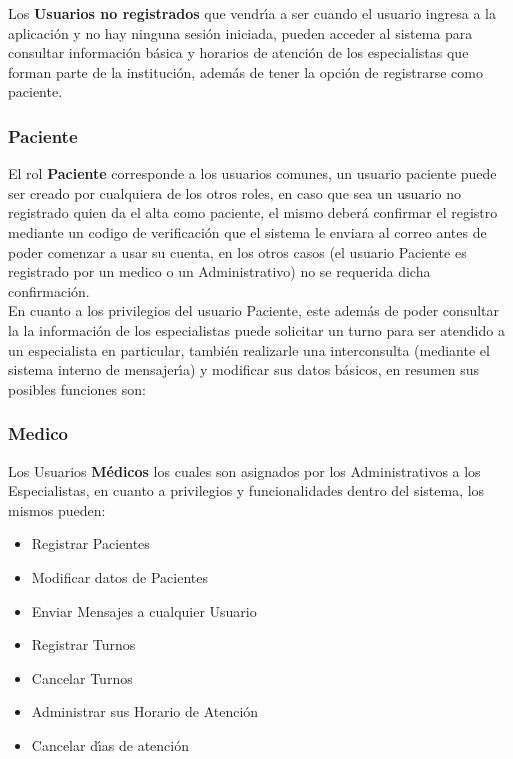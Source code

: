Los \textbf{Usuarios no registrados} que vendr\'{\i}a a ser cuando el usuario ingresa
a la aplicaci\'on y no hay ninguna sesi\'on iniciada, pueden acceder al sistema para 
consultar informaci\'on b\'asica y horarios de atenci\'on de los especialistas que 
forman parte de la instituci\'on, adem\'as de tener la opci\'on de registrarse 
como paciente.\\[0.1cm]    

\subsubsection{Paciente}

El rol \textbf{Paciente} corresponde a los usuarios comunes, un usuario paciente puede 
ser creado por cualquiera de los otros roles, en caso que sea un usuario no registrado
quien da el alta como paciente, el mismo deber\'a confirmar el registro mediante un
codigo de verificaci\'on que el sistema le enviara al correo antes de poder comenzar
a usar su cuenta, en los otros casos (el usuario Paciente es registrado por un 
medico o un Administrativo) no se requerida dicha confirmaci\'on.\\[0.1cm]

En cuanto a los privilegios del usuario Paciente, este adem\'as de poder consultar la 
la informaci\'on de los especialistas puede solicitar un turno para ser atendido 
a un especialista en particular, tambi\'en realizarle una interconsulta (mediante
el sistema interno de mensajer\'{\i}a) y modificar sus datos b\'asicos, en resumen sus 
posibles funciones son:


\subsubsection{Medico}

Los Usuarios \textbf{M\'edicos} los cuales son asignados por los Administrativos a 
los Especialistas, en cuanto a privilegios y funcionalidades dentro del sistema, 
los mismos pueden:

\begin{itemize}
    \item Registrar Pacientes
    \item Modificar datos de Pacientes
    \item Enviar Mensajes a cualquier Usuario
    \item Registrar Turnos 
    \item Cancelar Turnos
    \item Administrar sus Horario de Atenci\'on
    \item Cancelar d\'{\i}as de atenci\'on
\end{itemize}

